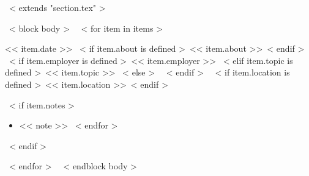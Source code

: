 ~< extends "section.tex" >~

~< block body >~
  ~< for item in items >~
    \begin{samepage}
      \cventry
        {<< item.date >>}
        {~< if item.about is defined >~<< item.about >>~< endif >~}
        {~< if item.employer is defined >~<< item.employer >>
         ~< elif item.topic is defined >~<< item.topic >>
         ~< else >~ \vspace*{-0.5cm}
         ~< endif >~}
        {~< if item.location is defined >~<< item.location >>~< endif >~}
        {}
        { %
          ~< if item.notes >~
            \begin{itemize}
              ~< for note in item.notes >~
                \item{<< note >>}
              ~< endfor >~
            \end{itemize}
          ~< endif >~
        }
    \end{samepage}
    \vspace{10pt}
  ~< endfor >~
  \vspace{-10pt}
~< endblock body >~
